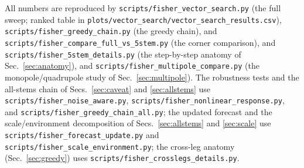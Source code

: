 \documentclass[11pt]{article}
\newcommand{\code}[1]{\texttt{#1}}
\begin{document}
All numbers are reproduced by \code{scripts/fisher\_vector\_search.py} (the full
sweep; ranked table in
\code{plots/vector\_search/vector\_search\_results.csv}),
\code{scripts/fisher\_greedy\_chain.py} (the greedy chain), and
\code{scripts/fisher\_compare\_full\_vs\_5stem.py} (the corner comparison), and
\code{scripts/fisher\_5stem\_details.py} (the step-by-step anatomy of
Sec.~\ref{sec:anatomy}), and \code{scripts/fisher\_multipole\_compare.py} (the
monopole/quadrupole study of Sec.~\ref{sec:multipole}).  The robustness tests and
the all-stems chain of Secs.~\ref{sec:caveat} and \ref{sec:allstems} use
\code{scripts/fisher\_noise\_aware.py}, \code{scripts/fisher\_nonlinear\_response.py},
and \code{scripts/fisher\_greedy\_chain\_all.py}; the updated forecast and the
scale/environment decomposition of Secs.~\ref{sec:allstems} and \ref{sec:scale}
use \code{scripts/fisher\_forecast\_update.py} and
\code{scripts/fisher\_scale\_environment.py}; the cross-leg anatomy
(Sec.~\ref{sec:greedy}) uses \code{scripts/fisher\_crosslegs\_details.py}.
\end{document}
